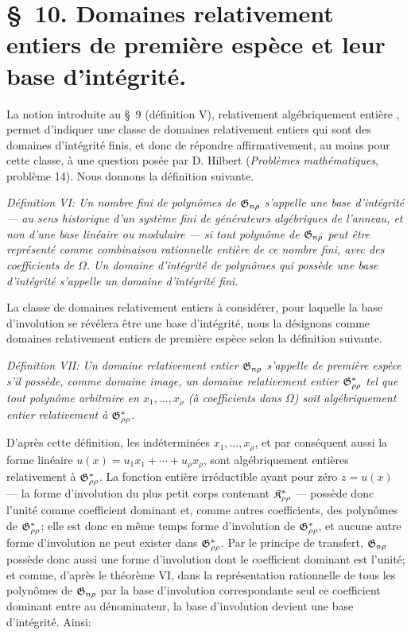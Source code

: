 \section*{\S\ 10. Domaines relativement entiers de première espèce et leur base d'intégrité.}

La notion introduite au \S\ 9 (définition V), \og{} relativement algébriquement entière \fg{}, permet d'indiquer une classe de domaines relativement entiers qui sont des domaines d’intégrité finis, et donc de répondre affirmativement, au moins pour cette classe, à une question posée par D. Hilbert (\emph{Problèmes mathématiques}, problème 14). Nous donnons la définition suivante.

\emph{Définition VI: Un nombre fini de polynômes de $\mathfrak{G}_{n\rho}$ s'appelle une base d'intégrité --- au sens historique d'un système fini de générateurs algébriques de l'anneau, et non d'une base linéaire ou modulaire --- si tout polynôme de $\mathfrak{G}_{n\rho}$ peut être représenté comme combinaison rationnelle entière de ce nombre fini, avec des coefficients de $\Omega$. Un domaine d’intégrité de polynômes qui possède une base d'intégrité s'appelle un domaine d’intégrité fini.}

La classe de domaines relativement entiers à considérer, pour laquelle la base d'involution se révélera être une base d'intégrité, nous la désignons comme domaines relativement entiers de première espèce selon la définition suivante.

\emph{Définition VII: Un domaine relativement entier $\mathfrak{G}_{n\rho}$ s'appelle de première espèce s'il possède, comme domaine image, un domaine relativement entier $\mathfrak{G}^*_{\rho\rho}$ tel que tout polynôme arbitraire en $x_1,\ldots,x_\rho$ (à coefficients dans $\Omega$) soit algébriquement entier relativement à $\mathfrak{G}^*_{\rho\rho}$.}

D'après cette définition, les indéterminées $x_1,\ldots,x_\rho$, et par conséquent aussi la forme linéaire $u(x)=u_1x_1+\cdots+u_\rho x_\rho$, sont algébriquement entières relativement à $\mathfrak{G}^*_{\rho\rho}$. La fonction entière irréductible ayant pour zéro $z=u(x)$ --- la forme d'involution du plus petit corps contenant $\mathfrak{K}^*_{\rho\rho}$ --- possède donc l'unité comme coefficient dominant et, comme autres coefficients, des polynômes de $\mathfrak{G}^*_{\rho\rho}$; elle est donc en même temps forme d'involution de $\mathfrak{G}^*_{\rho\rho}$, et aucune autre forme d'involution ne peut exister dans $\mathfrak{G}^*_{\rho\rho}$. Par le principe de transfert, $\mathfrak{G}_{n\rho}$ possède donc aussi une forme d'involution dont le coefficient dominant est l'unité; et comme, d'après le théorème VI, dans la représentation rationnelle de tous les polynômes de $\mathfrak{G}_{n\rho}$ par la base d'involution correspondante seul ce coefficient dominant entre au dénominateur, la base d'involution devient une base d'intégrité. Ainsi:


